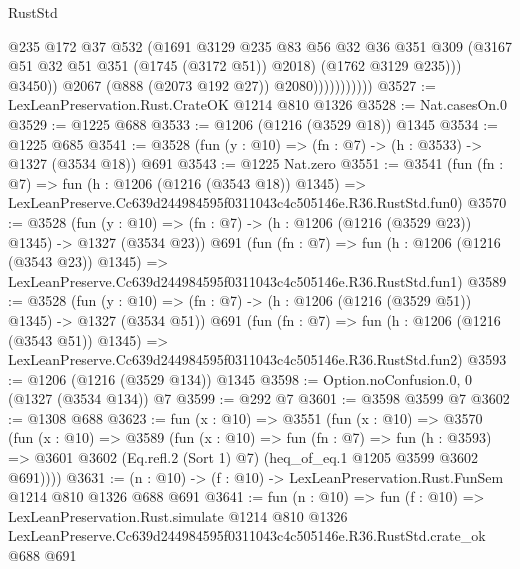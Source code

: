\begin{lexlean}{RustStd}
\begin{coremodule}
                                @235
                                @172
                                @37
                                @532
                                (@1691
                                  @3129
                                  @235
                                  @83
                                  @56
                                  @32
                                  @36
                                  @351
                                  @309
                                  (@3167 @51 @32 @51 @351 (@1745 (@3172 @51)) @2018)
                                  (@1762 @3129 @235)))
                              @3450))
                          @2067
                          (@888 (@2073 @192 @27))
                          @2080)))))))))))
@3527 := LexLeanPreservation.Rust.CrateOK @1214 @810 @1326
@3528 := Nat.casesOn.{0}
@3529 := @1225 @688
@3533 := @1206 (@1216 (@3529 @18)) @1345
@3534 := @1225 @685
@3541 := @3528 (fun (y : @10) => (fn : @7) -> (h : @3533) -> @1327 (@3534 @18)) @691
@3543 := @1225 Nat.zero
@3551 := @3541
    (fun (fn : @7) =>
    fun (h : @1206 (@1216 (@3543 @18)) @1345) =>
    LexLeanPreserve.Cc639d244984595f0311043c4c505146e.R36.RustStd.fun0)
@3570 := @3528
    (fun (y : @10) => (fn : @7) -> (h : @1206 (@1216 (@3529 @23)) @1345) -> @1327 (@3534 @23))
    @691
    (fun (fn : @7) =>
    fun (h : @1206 (@1216 (@3543 @23)) @1345) =>
    LexLeanPreserve.Cc639d244984595f0311043c4c505146e.R36.RustStd.fun1)
@3589 := @3528
    (fun (y : @10) => (fn : @7) -> (h : @1206 (@1216 (@3529 @51)) @1345) -> @1327 (@3534 @51))
    @691
    (fun (fn : @7) =>
    fun (h : @1206 (@1216 (@3543 @51)) @1345) =>
    LexLeanPreserve.Cc639d244984595f0311043c4c505146e.R36.RustStd.fun2)
@3593 := @1206 (@1216 (@3529 @134)) @1345
@3598 := Option.noConfusion.{0, 0} (@1327 (@3534 @134)) @7
@3599 := @292 @7
@3601 := @3598 @3599 @7
@3602 := @1308 @688
@3623 := fun (x : @10) =>
  @3551
    (fun (x : @10) =>
    @3570
      (fun (x : @10) =>
      @3589
        (fun (x : @10) =>
        fun (fn : @7) =>
        fun (h : @3593) =>
        @3601 @3602 (Eq.refl.{2} (Sort 1) @7) (heq_of_eq.{1} @1205 @3599 @3602 @691))))
@3631 := (n : @10) -> (f : @10) -> LexLeanPreservation.Rust.FunSem @1214 @810 @1326 @688 @691
@3641 := fun (n : @10) =>
  fun (f : @10) =>
  LexLeanPreservation.Rust.simulate
    @1214
    @810
    @1326
    LexLeanPreserve.Cc639d244984595f0311043c4c505146e.R36.RustStd.crate_ok
    @688
    @691
\end{coremodule}
\end{lexlean}
